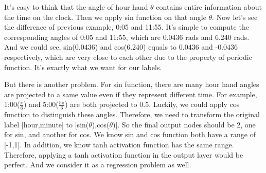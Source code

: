 \documentclass{article}
\begin{document}
It's easy to think that the angle of hour hand $\theta$ contains entire information about the time on the clock. Then we apply sin function on that angle $\theta$. Now let's see the difference of previous example, 0:05 and 11:55. It's simple to compute the corresponding angles of 0:05 and 11:55, which are 0.0436 rads and 6.240 rads. And we could see, sin(0.0436) and cos(6.240) equals to 0.0436 and -0.0436 respectively, which are very close to each other due to the property of periodic function. It's exactly what we want for our labels.

But there is another problem. For sin function, there are many hour hand angles are projected to a same value even if they represent different time. For example, 1:00($\frac{\pi}{6}$) and 5:00($\frac{5\pi}{6}$) are both projected to 0.5. Luckily, we could apply cos function to distinguish these angles. Therefore, we need to transform the original label [hour,minute] to [sin($\theta$),cos($\theta$)]. So the final output nodes should be 2, one for sin, and another for cos. We know sin and cos function both have a range of [-1,1]. In addition, we know tanh activation function has the same range. Therefore, applying a tanh activation function in the output layer would be perfect. And we consider it as a regression problem as well.
\end{document}
